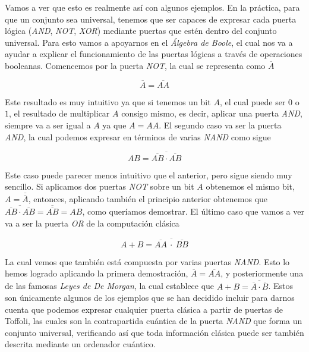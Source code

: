 \documentclass{article}
\numberwithin{equation}{section} %
\begin{document}
    \vspace{5mm}
    
    Vamos a ver que esto es realmente así con algunos ejemplos. En la práctica, para que un conjunto sea universal, tenemos que ser capaces de expresar cada puerta lógica (\textit{AND}, \textit{NOT}, \textit{XOR}) mediante puertas que estén dentro del conjunto universal. Para esto vamos a apoyarnos en el \textit{Álgebra de Boole}, el cual nos va a ayudar a explicar el funcionamiento de las puertas lógicas a través de operaciones booleanas. Comencemos por la puerta \textit{NOT}, la cual se representa como \( \overline{\textit{A}} \)

    \begin{equation*}
        \overline{A} = \overline{A A}
    \end{equation*}

    \vspace{2.5mm}

    Este resultado es muy intuitivo ya que si tenemos un bit \( A \), el cual puede ser \( 0 \) o \( 1 \), el resultado de multiplicar \( A \) consigo mismo, es decir, aplicar una puerta \textit{AND}, siempre va a ser igual a \( A \) ya que \( A = AA \). El segundo caso va ser la puerta \textit{AND}, la cual podemos expresar en términos de varias \textit{NAND} como sigue

    \begin{equation*}
        A B = \overline{ \overline{A B} \cdot \overline{A B} }
    \end{equation*}

    \vspace{2.5mm}

    Este caso puede parecer menos intuitivo que el anterior, pero sigue siendo muy sencillo. Si aplicamos dos puertas \textit{NOT} sobre un bit \( A \) obtenemos el mismo bit, \( A = \overline{\overline{A}}\), entonces, aplicando también el principio anterior obtenemos que \( \overline{ \overline{A B} \cdot \overline{A B} } = \overline{\overline{A B}} = AB \), como queríamos demostrar. El último caso que vamos a ver va a ser la puerta \textit{OR} de la computación clásica

    \begin{equation*}
        A + B =  \overline{ \overline{A A} \ \cdot \ \overline{B B} }
    \end{equation*}

    \vspace{2.5mm}

    La cual vemos que también está compuesta por varias puertas \textit{NAND}. Esto lo hemos logrado aplicando la primera demostración, \( \overline{A} = \overline{A A} \), y posteriormente una de las famosas \textit{Leyes de De Morgan}, la cual establece que \( A + B = \overline{\overline{A} \cdot \overline{B}} \). Estos son únicamente algunos de los ejemplos que se han decidido incluir para darnos cuenta que podemos expresar cualquier puerta clásica a partir de puertas de Toffoli, las cuales son la contrapartida cuántica de la puerta \textit{NAND} que forma un conjunto universal, verificando así que toda información clásica puede ser también descrita mediante un ordenador cuántico.
\end{document}

